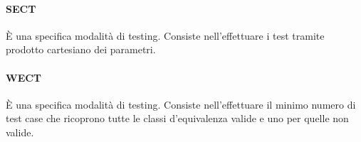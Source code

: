 \paragraph{SECT} \`{E} una specifica modalità di testing. Consiste nell'effettuare i test tramite prodotto cartesiano dei parametri.

\paragraph{WECT} \`{E} una specifica modalità di testing. Consiste nell'effettuare il minimo numero di test case che ricoprono tutte le classi d'equivalenza valide e uno per quelle non valide.